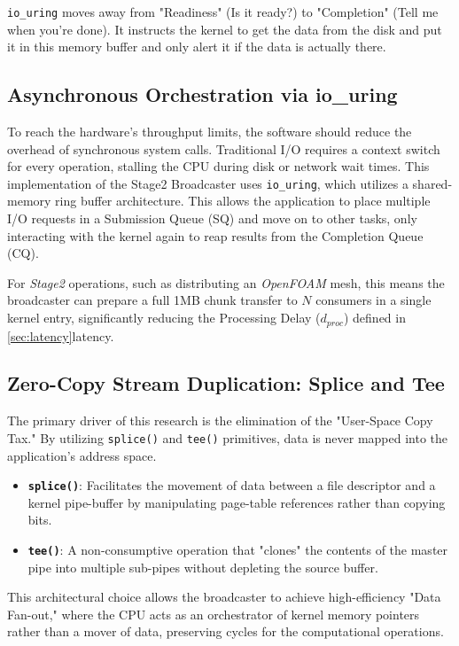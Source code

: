 \documentclass[
	a4paper,
	10pt,
	unnumberedsections,
	twoside, 
]{LTJournalArticle}
\begin{document}
\texttt{io\_uring} moves away from "Readiness" (Is it ready?) to "Completion" (Tell me when you're done). It instructs the kernel to get the data from the disk and put it in this memory buffer and only alert it if the data is actually there.

\subsection{Asynchronous Orchestration via io\_uring}
To reach the hardware's throughput limits, the software should reduce the overhead of synchronous system calls. Traditional I/O requires a context switch for every operation, stalling the CPU during disk or network wait times. This implementation of the Stage2 Broadcaster uses \texttt{io\_uring}, which utilizes a shared-memory ring buffer architecture. This allows the application to place multiple I/O requests in a Submission Queue (SQ) and move on to other tasks, only interacting with the kernel again to reap results from the Completion Queue (CQ).

For \textit{Stage2} operations, such as distributing an \textit{OpenFOAM} mesh, this means the broadcaster can prepare a full 1MB chunk transfer to $N$ consumers in a single kernel entry, significantly reducing the Processing Delay ($d_{proc}$) defined in \ref{sec:latency}{latency}.

\subsection{Zero-Copy Stream Duplication: Splice and Tee}
The primary driver of this research is the elimination of the "User-Space Copy Tax." By utilizing \texttt{splice()} and \texttt{tee()} primitives, data is never mapped into the application's address space. 
\begin{itemize}
	\item \textbf{\texttt{splice()}}: Facilitates the movement of data between a file descriptor and a kernel pipe-buffer by manipulating page-table references rather than copying bits.
	\item \textbf{\texttt{tee()}}: A non-consumptive operation that "clones" the contents of the master pipe into multiple sub-pipes without depleting the source buffer.
\end{itemize}
This architectural choice allows the broadcaster to achieve high-efficiency "Data Fan-out," where the CPU acts as an orchestrator of kernel memory pointers rather than a mover of data, preserving cycles for the computational operations.
\end{document}
